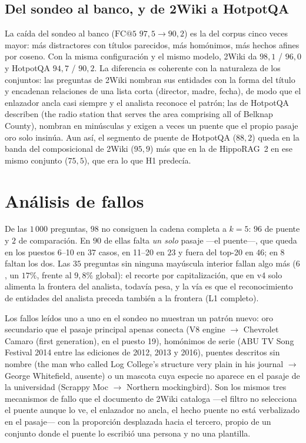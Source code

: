 \documentclass[11pt,a4paper]{article}
\newcommand{\hippo}{HippoRAG~2}
\newcommand{\gl}{\guillemotleft}
\newcommand{\gr}{\guillemotright}
\begin{document}
\subsection{Del sondeo al banco, y de 2Wiki a HotpotQA}
\label{sec:comparacion}

La caída del sondeo al banco ($\mathrm{FC@}5$ $97{,}5 \to 90{,}2$) es la del
corpus cinco veces mayor: más distractores con títulos parecidos, más
homónimos, más hechos afines por coseno. Con la misma configuración y el
mismo modelo, 2Wiki da $98{,}1$ / $96{,}0$ y HotpotQA $94{,}7$ / $90{,}2$. La
diferencia es coherente con la naturaleza de los conjuntos: las preguntas
de 2Wiki nombran sus entidades con la forma del título y encadenan
relaciones de una lista corta (director, madre, fecha), de modo que el
enlazador ancla casi siempre y el analista reconoce el patrón; las de
HotpotQA describen (\gl{}the radio station that serves the area comprising
all of Belknap County\gr{}), nombran en minúsculas y exigen a veces un puente
que el propio pasaje oro solo insinúa. Aun así, el segmento de puente de
HotpotQA ($88{,}2$) queda en la banda del composicional de 2Wiki ($95{,}9$)
más que en la de \hippo{} en ese mismo conjunto ($75{,}5$), que era lo que H1
predecía.

\section{Análisis de fallos}
\label{sec:fallos}

De las $1\,000$ preguntas, $98$ no consiguen la cadena completa a $k{=}5$:
$96$ de puente y $2$ de comparación. En $90$ de ellas falta \emph{un solo}
pasaje ---el puente---, que queda en los puestos 6--10 en $37$ casos, en
11--20 en $23$ y fuera del top-20 en $46$; en $8$ faltan los dos. Las $35$
preguntas sin ninguna mayúscula interior fallan algo más ($6$, un $17\%$,
frente al $9{,}8\%$ global): el recorte por capitalización, que en v4 solo
alimenta la frontera del analista, todavía pesa, y la vía es que el
reconocimiento de entidades del analista preceda también a la frontera (L1
completo).

Los fallos leídos uno a uno en el sondeo no muestran un patrón nuevo:
oro secundario que el pasaje principal apenas conecta (\gl{}V8 engine\gr{} $\to$
\gl{}Chevrolet Camaro (first generation)\gr{}, en el puesto 19), homónimos de
serie (\gl{}ABU TV Song Festival 2014\gr{} entre las ediciones de 2012, 2013 y
2016), puentes descritos sin nombre (\gl{}the man who called Log College's
structure very plain in his journal\gr{} $\to$ George Whitefield, ausente) o
un mascota cuya especie no aparece en el pasaje de la universidad
(\gl{}Scrappy Moc\gr{} $\to$ \gl{}Northern mockingbird\gr{}). Son los mismos
tres mecanismos de fallo que el documento de 2Wiki cataloga ---el filtro no
selecciona el puente aunque lo ve, el enlazador no ancla, el hecho puente no
está verbalizado en el pasaje--- con la proporción desplazada hacia el
tercero, propio de un conjunto donde el puente lo escribió una persona y no
una plantilla.
\end{document}
